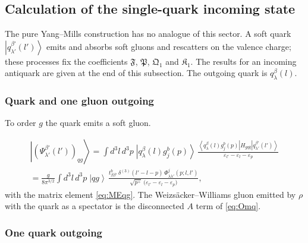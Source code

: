 \documentclass[11pt,a4paper]{article}
\numberwithin{equation}{section}
\newcommand{\mf}[1]{\mathfrak{#1}}
\newcommand{\eps}{\varepsilon}
\newcommand{\dthree}{\delta^{(3)}}
\newcommand{\ket}[1]{\left|#1\right\rangle}
\newcommand{\bra}[1]{\left\langle#1\right|}
\newcommand{\Ph}{\Phi}
\newcommand{\qk}[3]{q^{#1}_{#2}(#3)}
\newcommand{\gl}[3]{g^{#1}_{#2}(#3)}
\begin{document}
\subsection{Calculation of the single-quark incoming state}
\label{sec:wf-q}

The pure Yang--Mills construction has no analogue of this sector. A soft quark
$\ket{\qk{\beta'}{\lambda'}{l'}}$ emits and absorbs soft gluons and rescatters on the valence
charge; these processes fix the coefficients $\mf F$, $\mf P$, $\mf Q_{1}$ and $\mf K_{1}$. The
results for an incoming antiquark are given at the end of this subsection. The outgoing quark is
$\qk{\beta}{\lambda}{l}$.

\subsubsection{Quark and one gluon outgoing}

To order $g$ the quark emits a soft gluon.
\begin{center}
\end{center}
\begin{multline}
\ket{(\Psi^{\beta'}_{\lambda'}(l'))_{qg}}=\int\!d^{3}l\,d^{3}p\;\ket{\qk{\beta}{\lambda}{l}\gl{b}{j}{p}}\,
\frac{\bra{\qk{\beta}{\lambda}{l}\gl{b}{j}{p}}H_{gq\bar q}\ket{\qk{\beta'}{\lambda'}{l'}}}{\eps_{l'}-\eps_{l}-\eps_{p}}\\
=\frac{g}{8\pi^{3/2}}\int\!d^{3}l\,d^{3}p\;\ket{qg}\,
\frac{t^{b}_{\beta\beta'}\,\dthree(l'-l-p)\,\Ph^{j}_{\lambda\lambda'}(p;l,l')}{\sqrt{p^{+}}\,\big(\eps_{l'}-\eps_{l}-\eps_{p}\big)} ,
\label{eq:Pq-qg}
\end{multline}
with the matrix element \eqref{eq:MEqg}. The Weizs\"acker--Williams gluon emitted by $\rho$ with
the quark as a spectator is the disconnected $A$ term of \eqref{eq:Omq}.

\subsubsection{One quark outgoing}
\end{document}
